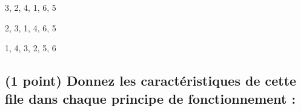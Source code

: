 \documentclass[11pt,a4paper]{article}
\begin{document}


\begin{center}
\begin{table}[ht!]
  \centering
  \begin{minipage}{0.33\textwidth}

\begin{center}
\begin{large}
3, 2, 4, 1, 6, 5
\end{large}

\medskip

\end{center}

  \end{minipage}
  \hfillx
  \begin{minipage}{0.33\textwidth}

\begin{center}
\begin{large}
2, 3, 1, 4, 6, 5
\end{large}

\medskip

\end{center}

  \end{minipage}
  \hfillx
  \begin{minipage}{0.33\textwidth}

\begin{center}
\begin{large}
1, 4, 3, 2, 5, 6
\end{large}

\medskip

\end{center}

  \end{minipage}
\end{table}
\end{center}

\vfillLast

\clearpage


\subsection{(1 point) Donnez les caractéristiques de cette file dans chaque principe de fonctionnement : }
\end{document}
